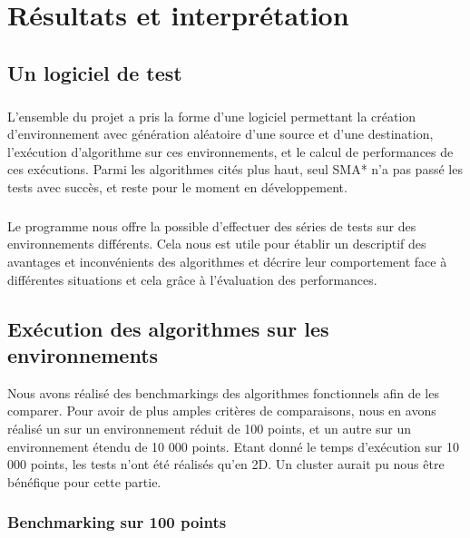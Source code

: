 \documentclass[pidr]{tnreport}
\begin{document}
\chapter{Résultats et interprétation}
	
	\section{Un logiciel de test}	
\paragraph{}
L'ensemble du projet a pris la forme d'une logiciel permettant la création d’environnement avec génération aléatoire d'une source et d'une destination, l’exécution d'algorithme sur ces environnements, et le calcul de performances de ces exécutions. Parmi les algorithmes cités plus haut, seul SMA* n'a pas passé les tests avec succès, et reste pour le moment en développement. 

\paragraph{}
Le programme nous offre la possible d'effectuer des séries de tests sur des environnements différents. Cela nous est utile pour établir un descriptif des avantages et inconvénients des algorithmes et décrire leur comportement face à différentes situations et cela grâce à l'évaluation des performances. 
	
	\section{Exécution des algorithmes sur les environnements}
	
	Nous avons réalisé des benchmarkings des algorithmes fonctionnels afin de les comparer. Pour avoir de plus amples critères de comparaisons, nous en avons réalisé un sur un environnement réduit de 100 points, et un autre sur un environnement étendu de 10 000 points. Etant donné le temps d'exécution sur 10 000 points, les tests n'ont été réalisés qu'en 2D. Un cluster aurait pu nous être bénéfique pour cette partie.
	
		\subsection{Benchmarking sur 100 points}
		
\end{document}

